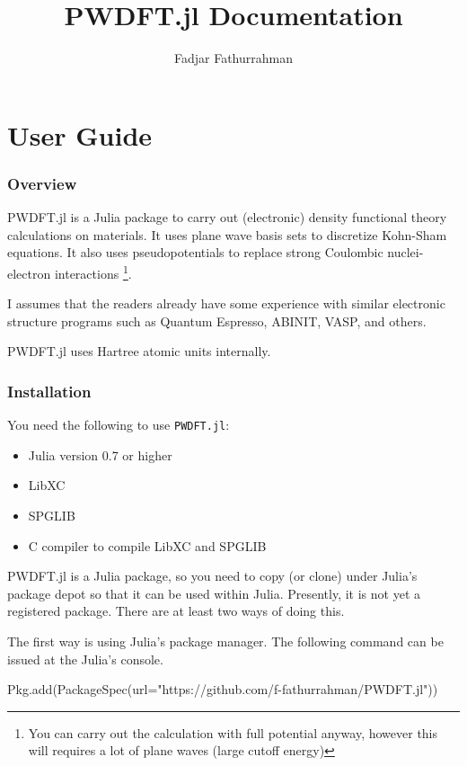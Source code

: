 \documentclass[a4paper,12pt]{article}
\begin{document}
\title{\textsf{PWDFT.jl} Documentation}
\author{Fadjar Fathurrahman}
\maketitle

\tableofcontents

\part{User Guide}

\section{Overview}

\textsf{PWDFT.jl} is a Julia package to carry out (electronic)
density functional theory calculations on materials.
It uses plane wave basis sets to discretize Kohn-Sham equations.
It also uses pseudopotentials to replace strong Coulombic nuclei-electron
interactions \footnote{You can carry out the calculation with
full potential anyway, however this will requires a lot of plane waves (large
cutoff energy)}.

I assumes that the readers already have some experience with similar electronic
structure programs such as Quantum Espresso, ABINIT, VASP, and others.

\textsf{PWDFT.jl} uses Hartree atomic units internally.

\section{Installation}

You need the following to use \texttt{PWDFT.jl}:
\begin{itemize}
\item Julia version 0.7 or higher
\item LibXC
\item SPGLIB
\item C compiler to compile LibXC and SPGLIB
\end{itemize}

\textsf{PWDFT.jl} is a Julia package, so you need to copy (or clone)
under Julia's package depot so that it can be used within Julia.
Presently, it is not yet a registered package. There are at least
two ways of doing this.

The first way is using Julia's package manager. The following command
can be issued at the Julia's console.
\begin{juliacode}
Pkg.add(PackageSpec(url="https://github.com/f-fathurrahman/PWDFT.jl"))
\end{juliacode}
\end{document}
